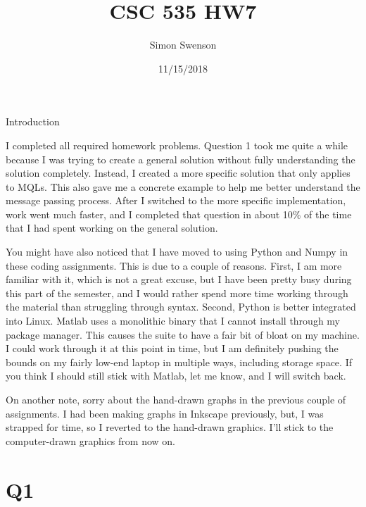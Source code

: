 \documentclass{article}
\title{CSC 535 HW7}
\date{11/15/2018}
\author{Simon Swenson}
\begin{document}
\maketitle
{}

\large Introduction

\small I completed all required homework problems. Question 1 took me quite a 
while because I was trying to create a general solution without fully 
understanding the solution completely. Instead, I created a more specific solution that only applies to MQLs. This also 
gave me a concrete example to help me better understand the message passing 
process. After I switched to the more specific implementation, work went much 
faster, and I completed that question in about 10\% of the time that I had spent 
working on the general solution.

You might have also noticed that I have moved 
to using Python and Numpy in these coding assignments. This is due to a couple 
of reasons. First, I am more familiar with it, which is not a great excuse, but 
I have been pretty busy during this part of the semester, and I would rather spend 
more time working through the material than struggling through syntax. Second, 
Python is better integrated into Linux. Matlab uses a monolithic binary that I 
cannot install through my package manager. This causes the suite to have a fair 
bit of bloat on my machine. I could work through it at this point in time, but I 
am definitely pushing 
the bounds on my fairly low-end laptop in multiple ways, including storage 
space. If you think I should still stick with Matlab, let me know, and I will switch back.


On another note, sorry about the hand-drawn 
graphs in the previous couple of assignments. I had been making graphs in 
Inkscape previously, but, I was strapped for time, so I reverted to the 
hand-drawn graphics. I'll stick to the computer-drawn graphics from now on.

\section{Q1}
\end{document}
